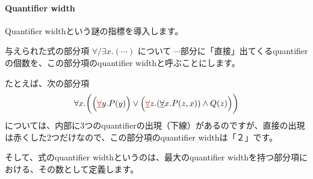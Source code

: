 \documentclass[a4paper,UKenglish,cleveref, autoref, thm-restate]{lipics-v2021}
\newenvironment{Jcomment}%
{\begin{screen}\begin{CJK}{UTF8}{ipxm}}%
{\end{CJK}\end{screen}}
\begin{document}
\paragraph*{Quantifier width}
\begin{Jcomment}
Quantifier widthという謎の指標を導入します。

与えられた式の部分項 $\forall/\exists x. ( \cdots )$ について $\cdots$部分に「直接」出てくるquantifierの個数を、この部分項のquantifier widthと呼ぶことにします。

たとえば、次の部分項
$$
\forall x.\biggl( \Bigl(\underline{{\color{red}\forall}} y. P(y)\Bigr) \lor \Bigl(\underline{{\color{red}\forall}} z. (\underline{\forall} x. P(z, x)) \land Q(z)\Bigr) \biggr)
$$
については、内部に3つのquantifierの出現（下線）があるのですが、直接の出現は赤くした2つだけなので、この部分項のquantifier widthは「２」です。

そして、式のquantifier widthというのは、最大のquantifier widthを持つ部分項における、その数として定義します。
\end{Jcomment}









\end{document}

